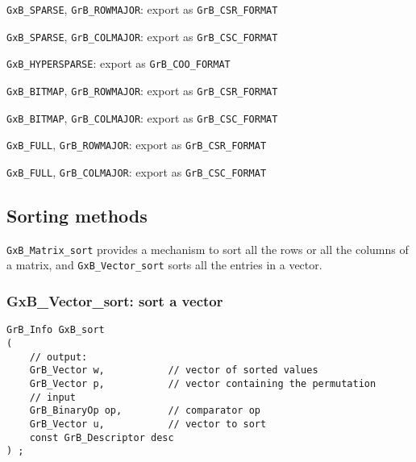 \documentclass[12pt]{article}
\newenvironment{packed_itemize}{
\begin{itemize}
  \setlength{\itemsep}{1pt}
  \setlength{\parskip}{0pt}
  \setlength{\parsep}{0pt}
}{\end{itemize}}
\begin{document}
\begin{packed_itemize}
\item \verb'GxB_SPARSE', \verb'GrB_ROWMAJOR': export as \verb'GrB_CSR_FORMAT'
\item \verb'GxB_SPARSE', \verb'GrB_COLMAJOR': export as \verb'GrB_CSC_FORMAT'
\item \verb'GxB_HYPERSPARSE': export as \verb'GrB_COO_FORMAT'
\item \verb'GxB_BITMAP', \verb'GrB_ROWMAJOR': export as \verb'GrB_CSR_FORMAT'
\item \verb'GxB_BITMAP', \verb'GrB_COLMAJOR': export as \verb'GrB_CSC_FORMAT'
\item \verb'GxB_FULL', \verb'GrB_ROWMAJOR': export as \verb'GrB_CSR_FORMAT'
\item \verb'GxB_FULL', \verb'GrB_COLMAJOR': export as \verb'GrB_CSC_FORMAT'
\end{packed_itemize}

\newpage
\subsection{Sorting methods}
\label{sorting_methods}

\verb'GxB_Matrix_sort' provides a mechanism to sort all the rows or
all the columns of a matrix, and \verb'GxB_Vector_sort' sorts all the
entries in a vector.

\subsubsection{{\sf GxB\_Vector\_sort:} sort a vector}
\label{vector_sort}

\begin{mdframed}[userdefinedwidth=6in]
{\footnotesize
\begin{verbatim}
GrB_Info GxB_sort
(
    // output:
    GrB_Vector w,           // vector of sorted values
    GrB_Vector p,           // vector containing the permutation
    // input
    GrB_BinaryOp op,        // comparator op
    GrB_Vector u,           // vector to sort
    const GrB_Descriptor desc
) ;
\end{verbatim}
} \end{mdframed}
\end{document}
